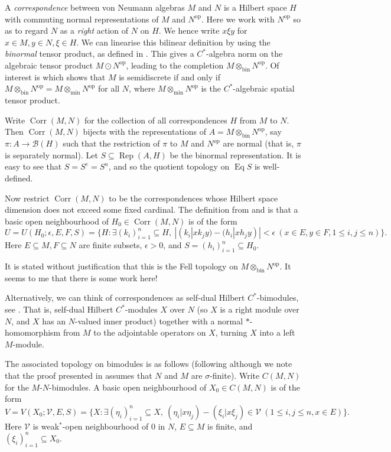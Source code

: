 \documentclass[a4paper,11pt]{article}
\newcommand{\mc}[1]{{\mathcal{#1}}}
\newcommand{\Rep}{\operatorname{Rep}}
\newcommand{\Eq}{\operatorname{Eq}}
\newcommand{\op}{{\operatorname{op}}}
\newcommand{\bin}{{\operatorname{bin}}}
\newcommand{\Corr}{{\operatorname{Corr}}}
\begin{document}
A \emph{correspondence} between von Neumann algebras $M$ and $N$ is a Hilbert
space $H$ with commuting normal representations of $M$ and $N^\op$.  Here we
work with $N^\op$ so as to regard $N$ as a \emph{right} action of $N$ on $H$.
We hence write $x\xi y$ for $x\in M, y\in N, \xi\in H$.
We can linearise this bilinear definition by using the \emph{binormal}
tensor product, as defined in \cite{el}.  This gives a $C^*$-algebra norm on
the algebraic tensor product $M\odot N^\op$, leading to the completion
$M\otimes_{\bin}N^\op$.  Of interest is \cite[Theorem~4.1]{el} which shows
that $M$ is semidiscrete if and only if $M\otimes_\bin N^\op = M\otimes_{\min}
N^\op$ for all $N$, where $M\otimes_{\min} N^\op$ is the $C^*$-algebraic
spatial tensor product.

Write $\Corr(M,N)$ for the collection of all correspondences $H$ from $M$ to
$N$.  Then $\Corr(M,N)$ bijects with the representations of $A = 
M\otimes_\bin N^\op$, say $\pi:A\rightarrow\mc B(H)$ such that the restriction
of $\pi$ to $M$ and $N^\op$ are normal (that is, $\pi$ is separately normal).
Let $S\subseteq\Rep(A,H)$ be the binormal representation.  It is easy to see
that $S = S^e = S^u$, and so the quotient topology on $\Eq S$ is well-defined.

Now restrict $\Corr(M,N)$ to be the correspondences whose Hilbert space
dimension does not exceed some fixed cardinal.
The definition from \cite{cj} and \cite[Section~1.12]{ad2} is that a basic
open neighbourhood of $H_0\in\Corr(M,N)$ is of the form
\[ U=U(H_0; \epsilon,E,F,S) =
\big\{ H : \exists (k_i)_{i=1}^n\subseteq H, \ 
|(k_i|xk_jy) - (h_i|xh_jy)|<\epsilon \ 
(x\in E, y\in F, 1\leq i,j\leq n)
\big\}. \]
Here $E\subseteq M, F\subseteq N$ are finite subsets, $\epsilon>0$, and
$S=(h_i)_{i=1}^n \subseteq H_0$.

It is stated without justification that this is the Fell topology on
$M\otimes_\bin N^\op$.  It seems to me that there is some work here!

Alternatively, we can think of correspondences as self-dual Hilbert 
$C^*$-bimodules, see \cite{ad1, ad2}.  That is, self-dual Hilbert $C^*$-modules
$X$ over $N$ (so $X$ is a right module over $N$, and $X$ has an $N$-valued
inner product) together with a normal $*$-homomorphism from $M$ to the
adjointable operators on $X$, turning $X$ into a left $M$-module.

The associated topology on bimodules is as follows (following
\cite[Section~1.12]{ad2} although we note that the proof presented in \cite{ad2}
assumes that $N$ and $M$ are $\sigma$-finite).  Write $C(M,N)$ for the
$M$-$N$-bimodules.  A basic
open neighbourhood of $X_0\in C(M,N)$ is of the form
\[ V=V(X_0; \mc V, E,S) = \big\{
X : \exists(\eta_i)_{i=1}^n\subseteq X, \ 
(\eta_i|x\eta_j) - (\xi_i|x\xi_j) \in\mc V \ 
(1\leq i,j\leq n, x\in E)
\big\}. \]
Here $\mc V$ is weak$^*$-open neighbourhood of $0$ in $N$, $E\subseteq M$ is
finite, and $(\xi_i)_{i=1}^n \subseteq X_0$.
\end{document}

